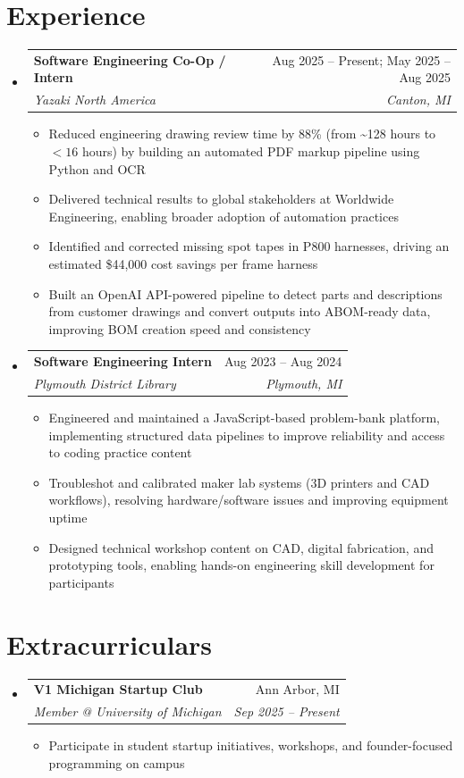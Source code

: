\documentclass[letterpaper,11pt]{article}
\makeatletter
\newcommand{\resumeItem}[1]{
  \item\small{
    {#1 \vspace{-2pt}}
  }
}
\newcommand{\resumeSubheading}[4]{
  \vspace{-2pt}\item
    \begin{tabular*}{0.97\textwidth}[t]{l@{\extracolsep{\fill}}r}
      \textbf{#1} & #2 \\
      \textit{\small#3} & \textit{\small #4} \\
    \end{tabular*}\vspace{-7pt}
}
\newcommand{\resumeSubHeadingListStart}{\begin{itemize}[leftmargin=0.15in, label={}]}
\newcommand{\resumeSubHeadingListEnd}{\end{itemize}}
\newcommand{\resumeItemListStart}{\begin{itemize}}
\newcommand{\resumeItemListEnd}{\end{itemize}\vspace{-5pt}}
\makeatother
\begin{document}
\section{Experience}
  \resumeSubHeadingListStart

    \resumeSubheading
      {Software Engineering Co-Op / Intern}{Aug 2025 -- Present; May 2025 -- Aug 2025}
      {Yazaki North America}{Canton, MI}
      \resumeItemListStart
        \resumeItem{Reduced engineering drawing review time by 88\% (from \textasciitilde{}128 hours to $<16$ hours) by building an automated PDF markup pipeline using Python and OCR}
        \resumeItem{Delivered technical results to global stakeholders at Worldwide Engineering, enabling broader adoption of automation practices}
        \resumeItem{Identified and corrected missing spot tapes in P800 harnesses, driving an estimated \$44,000 cost savings per frame harness}
        \resumeItem{Built an OpenAI API-powered pipeline to detect parts and descriptions from customer drawings and convert outputs into ABOM-ready data, improving BOM creation speed and consistency}
      \resumeItemListEnd

    \resumeSubheading
      {Software Engineering Intern}{Aug 2023 -- Aug 2024}
      {Plymouth District Library}{Plymouth, MI}
      \resumeItemListStart
        \resumeItem{Engineered and maintained a JavaScript-based problem-bank platform, implementing structured data pipelines to improve reliability and access to coding practice content}
        \resumeItem{Troubleshot and calibrated maker lab systems (3D printers and CAD workflows), resolving hardware/software issues and improving equipment uptime}
        \resumeItem{Designed technical workshop content on CAD, digital fabrication, and prototyping tools, enabling hands-on engineering skill development for participants}
    \resumeItemListEnd
  \resumeSubHeadingListEnd


\section{Extracurriculars}
  \resumeSubHeadingListStart
    \resumeSubheading
      {V1 Michigan Startup Club}{Ann Arbor, MI}
      {Member @ University of Michigan}{Sep 2025 -- Present}
      \resumeItemListStart
        \resumeItem{Participate in student startup initiatives, workshops, and founder-focused programming on campus}
      \resumeItemListEnd
  \resumeSubHeadingListEnd
\end{document}
